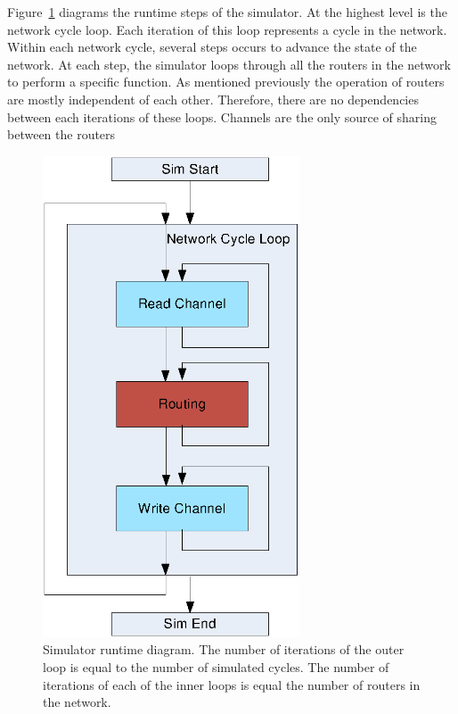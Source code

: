 Figure~\ref{fig:runtime} diagrams the runtime steps of the simulator. At the highest level is the network cycle loop. Each iteration of this loop represents a cycle in the network. Within each network cycle, several steps occurs to advance the state of the network. At each step, the simulator loops through all the routers in the network to perform a specific function. As mentioned previously the operation of routers are mostly independent of each other. Therefore, there are no dependencies between each iterations of these loops. Channels are the only source of sharing between the routers 
\begin{figure}[h]
\centering
\includegraphics[width=3in]{runtime.eps}
\caption{Simulator runtime diagram. The number of iterations of the outer loop is equal to the number of simulated cycles. The number of iterations of each of the inner loops is equal the number of routers in the network.}
\label{fig:runtime}
\end{figure}
